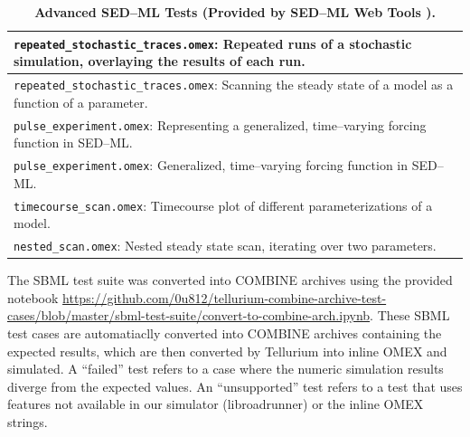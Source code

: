 \documentclass[10pt,letterpaper]{article}
\newlength\savedwidth
\newcommand\thickhline{\noalign{\global\savedwidth\arrayrulewidth\global\arrayrulewidth 2pt}%
\hline
\noalign{\global\arrayrulewidth\savedwidth}}
\begin{document}
\clearpage

\begin{table}[t]
\centering
\caption{
{\bf Advanced SED--ML Tests (Provided by SED--ML Web Tools \cite{bergmann2017sed}).} }
\begin{tabular}{p{12cm}}
\hline %
  \texttt{repeated\_stochastic\_traces.omex}: Repeated runs of a stochastic simulation, overlaying the results of each run. \\ \hline
  \texttt{repeated\_stochastic\_traces.omex}: Scanning the steady state of a model as a function of a parameter. \\ \hline
  \texttt{pulse\_experiment.omex}: Representing a generalized, time--varying forcing function in SED--ML. \\ \hline
  \texttt{pulse\_experiment.omex}: Generalized, time--varying forcing function in SED--ML. \\ \hline
  \texttt{timecourse\_scan.omex}: Timecourse plot of different parameterizations of a model. \\ \hline
  \texttt{nested\_scan.omex}: Nested steady state scan, iterating over two parameters. \\ \hline
\end{tabular}
\begin{flushleft} The SBML test suite was converted into COMBINE archives using the provided notebook \href{https://github.com/0u812/tellurium-combine-archive-test-cases/blob/master/sbml-test-suite/convert-to-combine-arch.ipynb}{https://github.com/0u812/tellurium-combine-archive-test-cases/blob/master/sbml-test-suite/convert-to-combine-arch.ipynb}. These SBML test cases are automatiaclly converted into COMBINE archives containing the expected results, which are then converted by Tellurium into inline OMEX and simulated. A ``failed'' test refers to a case where the numeric simulation results diverge from the expected values. An ``unsupported'' test refers to a test that uses features not available in our simulator (libroadrunner) or the inline OMEX strings.
\end{flushleft}
\label{swt-examples}
\end{table}

\clearpage
\end{document}
